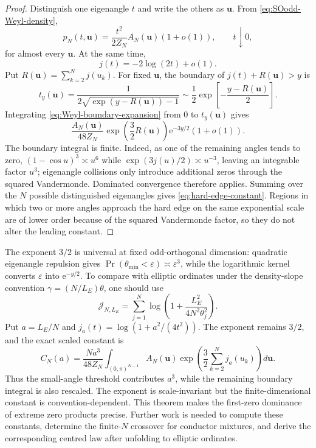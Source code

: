 \documentclass[11pt,reqno]{amsart}
\theoremstyle{remark}
\newcommand{\e}{\mathrm{e}}
\begin{document}
\begin{proof}
Distinguish one eigenangle $t$ and write the others as $\mathbf u$.  From \eqref{eq:SOodd-Weyl-density},
\begin{equation}
  p_N(t,\mathbf u)
  =\frac{t^2}{2Z_N}A_N(\mathbf u)(1+o(1)),
  \qquad t\downarrow0,
  \label{eq:Weyl-boundary-expansion}
\end{equation}
for almost every $\mathbf u$.  At the same time,
\begin{equation}
  j(t)=-2\log(2t)+o(1).
  \label{eq:j-hard-edge-asymptotic}
\end{equation}
Put $R(\mathbf u)=\sum_{k=2}^{N}j(u_k)$.  For fixed $\mathbf u$, the boundary of
$j(t)+R(\mathbf u)>y$ is
\begin{equation}
  t_y(\mathbf u)
  =\frac1{2\sqrt{\exp(y-R(\mathbf u))-1}}
  \sim\frac12\exp\!\left[-\frac{y-R(\mathbf u)}2\right].
\end{equation}
Integrating \eqref{eq:Weyl-boundary-expansion} from $0$ to $t_y(\mathbf u)$ gives
\begin{equation}
  \frac{A_N(\mathbf u)}{48Z_N}
  \exp\!\left(\frac32R(\mathbf u)\right)
  \e^{-3y/2}(1+o(1)).
\end{equation}
The boundary integral is finite.  Indeed, as one of the remaining angles tends to zero,
$(1-\cos u)^3\asymp u^6$ while $\exp(3j(u)/2)\asymp u^{-3}$, leaving an integrable factor $u^3$; eigenangle collisions only introduce additional zeros through the squared Vandermonde.  Dominated convergence therefore applies.  Summing over the $N$ possible distinguished eigenangles gives \eqref{eq:hard-edge-constant}.  Regions in which two or more angles approach the hard edge on the same exponential scale are of lower order because of the squared Vandermonde factor, so they do not alter the leading constant.
\end{proof}

The exponent $3/2$ is universal at fixed odd-orthogonal dimension: quadratic eigenangle repulsion gives $\Pr(\theta_{\min}<\varepsilon)\asymp\varepsilon^3$, while the logarithmic kernel converts $\varepsilon$ into $\e^{-y/2}$.  To compare with elliptic ordinates under the density-slope convention $\gamma=(N/L_E)\theta$, one should use
\begin{equation}
  \mathcal J_{N,L_E}
  =\sum_{j=1}^{N}\log\!\left(1+\frac{L_E^2}{4N^2\theta_j^2}\right).
\end{equation}
Put $a=L_E/N$ and $j_a(t)=\log(1+a^2/(4t^2))$.  The exponent remains $3/2$, and the exact scaled constant is
\begin{equation}
  C_N(a)=\frac{Na^3}{48Z_N}
  \int_{(0,\pi)^{N-1}}A_N(\mathbf u)
  \exp\!\left(\frac32\sum_{k=2}^{N}j_a(u_k)\right)d\mathbf u.
  \label{eq:scaled-hard-edge-constant}
\end{equation}
Thus the small-angle threshold contributes $a^3$, while the remaining boundary integral is also rescaled.  The exponent is scale-invariant but the finite-dimensional constant is convention-dependent.  This theorem makes the first-zero dominance of extreme zero products precise.  Further work is needed to compute these constants, determine the finite-$N$ crossover for conductor mixtures, and derive the corresponding centred law after unfolding to elliptic ordinates.
\end{document}
